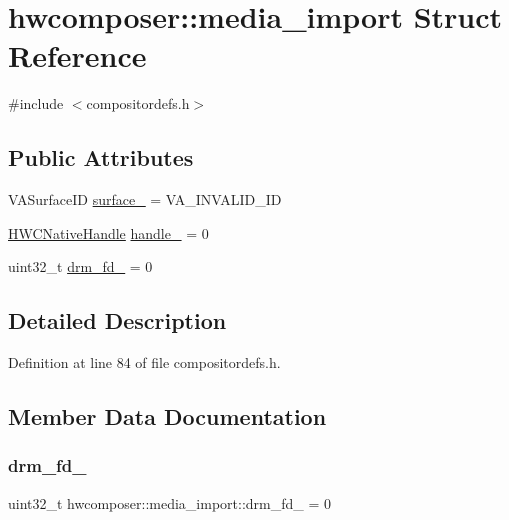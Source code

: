 \hypertarget{structhwcomposer_1_1media__import}{}\section{hwcomposer\+:\+:media\+\_\+import Struct Reference}
\label{structhwcomposer_1_1media__import}


{\ttfamily \#include $<$compositordefs.\+h$>$}

\subsection*{Public Attributes}
\begin{DoxyCompactItemize}
\item 
V\+A\+Surface\+ID \mbox{\hyperlink{structhwcomposer_1_1media__import_af82420941f64a848639e0ac80a7b2861}{surface\+\_\+}} = V\+A\+\_\+\+I\+N\+V\+A\+L\+I\+D\+\_\+\+ID
\item 
\mbox{\hyperlink{alios_2platformdefines_8h_ac0a2eaf260f556d17fe489911f017bdf}{H\+W\+C\+Native\+Handle}} \mbox{\hyperlink{structhwcomposer_1_1media__import_ab43515fb27f0e91598d906ae81acb6cd}{handle\+\_\+}} = 0
\item 
uint32\+\_\+t \mbox{\hyperlink{structhwcomposer_1_1media__import_add4939656c584a9b2f25e38eb845602f}{drm\+\_\+fd\+\_\+}} = 0
\end{DoxyCompactItemize}


\subsection{Detailed Description}


Definition at line 84 of file compositordefs.\+h.



\subsection{Member Data Documentation}
\mbox{\label{structhwcomposer_1_1media__import_add4939656c584a9b2f25e38eb845602f}} 
\subsubsection{\texorpdfstring{drm\+\_\+fd\+\_\+}{drm\_fd\_}}
{\footnotesize\ttfamily uint32\+\_\+t hwcomposer\+::media\+\_\+import\+::drm\+\_\+fd\+\_\+ = 0}



